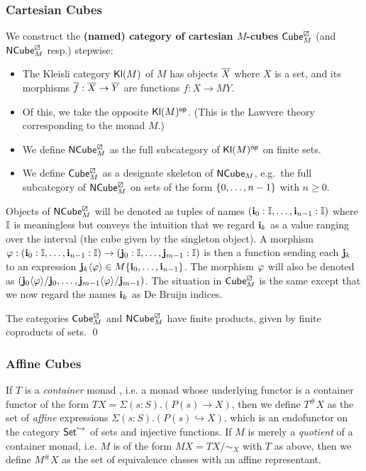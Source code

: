 \documentclass[a4paper]{memoir}
\begin{document}
\subsubsection{Cartesian Cubes}
\begin{definition}
	We construct the \textbf{(named) category of cartesian $M$-cubes} ${\mathsf{Cube}}^\boxslash_M$ (and ${\mathsf{NCube}}^\boxslash_M$ resp.) stepwise:
	\begin{itemize}
		\item The Kleisli category ${\mathsf{Kl}}(M)$ of $M$ has objects ${\overline{X}}$ where $X$ is a set, and its morphisms ${\overline{f}} : {\overline{X}} \to {\overline{Y}}$ are functions $f : X \to MY$.
		\item Of this, we take the opposite ${\mathsf{Kl}}(M)^{\mathsf{op}}$. (This is the Lawvere theory corresponding to the monad $M$.)
		\item We define ${\mathsf{NCube}}^\boxslash_M$ as the full subcategory of ${\mathsf{Kl}}(M)^{\mathsf{op}}$ on finite sets.
		\item We define ${\mathsf{Cube}}^\boxslash_M$ as a designate skeleton of ${\mathsf{NCube}}_M$, e.g.\ the full subcategory of ${\mathsf{NCube}}^\boxslash_M$ on sets of the form $\mathopen{}\left\{ 0, \ldots, n-1 \right\}\mathclose{}$ with $n \geq 0$.
	\end{itemize}
\end{definition}
Objects of ${\mathsf{NCube}}^\boxslash_M$ will be denoted as tuples of names $(\mathbf{i}_0 : {\mathbb I}, \ldots, \mathbf{i}_{n-1} : {\mathbb I})$ where ${\mathbb I}$ is meaningless but conveys the intuition that we regard $\mathbf{i}_k$ as a value ranging over the interval (the cube given by the singleton object).
A morphism $\varphi : (\mathbf{i}_0 : {\mathbb I}, \ldots, \mathbf{i}_{n-1} : {\mathbb I}) \to (\mathbf{j}_0 : {\mathbb I}, \ldots, \mathbf{j}_{m-1} : {\mathbb I})$ is then a function sending each $\mathbf{j}_k$ to an expression $\mathbf{j}_k \langle \varphi \rangle \in M\mathopen{}\left\{ \mathbf{i}_0, \ldots, \mathbf{i}_{n-1} \right\}\mathclose{}$.
The morphism $\varphi$ will also be denoted as $(\mathbf{j}_0 \langle \varphi \rangle / \mathbf{j}_0, \ldots, \mathbf{j}_{m-1} \langle \varphi \rangle / \mathbf{j}_{m-1})$.
The situation in ${\mathsf{Cube}}^\boxslash_M$ is the same except that we now regard the names $\mathbf{i}_k$ as De Bruijn indices.

\begin{corollary}
The categories ${\mathsf{Cube}}^\boxslash_M$ and ${\mathsf{NCube}}^\boxslash_M$ have finite products, given by finite coproducts of sets. \qed
\end{corollary}

\subsubsection{Affine Cubes}
If $T$ is a \emph{container} monad \cite{container-combinatorics}, i.e. a monad whose underlying functor is a container functor \cite{containers} of the form $TX = \Sigma(s : S).(P(s) \to X)$, then we define $T^\# X$ as the set of \emph{affine} expressions $\Sigma(s : S).(P(s) \hookrightarrow X)$, which is an endofunctor on the category ${\mathsf{Set}}^{\hookrightarrow}$ of sets and injective functions.
If $M$ is merely a \emph{quotient} of a container monad, i.e. $M$ is of the form $MX = TX/\sim_X$ with $T$ as above, then we define $M^\# X$ as the set of equivalence classes with an affine representant.
\end{document}
